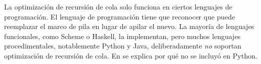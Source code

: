 La optimización de recursión de cola solo funciona en ciertos lenguajes de programación. El lenguaje de programación tiene que reconocer que puede reemplazar el marco de pila en lugar de apilar el nuevo. La mayoría de lenguajes funcionales, como Scheme o Haskell, la implementan, pero muchos lenguajes procedimentales, notablemente Python y Java, deliberadamente \emph{no} soportan optimización de recursión de cola. En \textcite{guido_tail_recursion} se explica por qué no se incluyó en Python.
